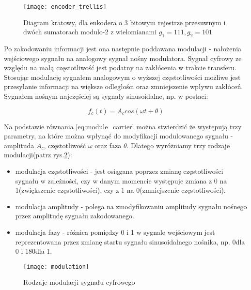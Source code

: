 \documentclass[document.tex]{subfiles}
\begin{document}
\begin{figure}[h]
\texttt{[image: encoder\_trellis]}
\caption{Diagram kratowy, dla enkodera o 3 bitowym rejestrze przesuwnym 
i dwóch sumatorach modulo-2 z wielomianami $g_1 = 111, g_2 = 101$ \protect\cite{Comm_Sklar}}
\label{fig:encoder_trellis}
\end{figure}

\indent Po zakodowaniu informacji jest ona następnie poddawana modulacji - nałożenia wejściowego sygnału na analogowy sygnał nośny modulatora.\cite{Comm_Sklar}\cite{modulacja_put} Sygnał cyfrowy ze względu na małą częstotliwość jest podatny na zakłócenia w trakcie transferu. Stosując modulację 
sygnałem analogowym o wyższej częstotliwości możliwe jest przesyłanie informacji na większe odległości oraz zmniejszenie wpływu zakłóceń.
Sygnałem nośnym najczęściej są sygnały sinusoidalne, np. w postaci\cite{modulacja_agh_amp}\cite{modulacja_put}:

\begin{equation}
    f_c(t) = A_c cos(\omega t + \theta)
    \label{eq:module_carrier}
\end{equation}

Na podstawie równania \ref{eq:module_carrier} można stwierdzić że występują trzy parametry, na które można wpłynąć do modyfikacji modulowanego sygnału - amplituda $A_c$, częstotliwość $\omega$ oraz faza $\theta$. Dlatego wyróżniamy trzy rodzaje modulacji(patrz rys.\ref{fig:modulation}):
\begin{itemize}
    \item modulacja częstotliwości - jest osiągana poprzez zmianę częstotliwości sygnału w zależności, czy w danym momencie występuje zmiana z 0 na 1(zwiększenie częstotliwości), czy z 1 na 0(zmniejszenie częstotliwości).
    \item modulacja amplitudy - polega na zmodyfikowaniu amplitudy sygnału nośnego przez amplitudę sygnału zakodowanego.
    \item modulacja fazy - różnica pomiędzy 0 i 1 w sygnale wejściowym jest reprezentowana przez zmianę startu sygnału sinusoidalnego nośnika, np. 0\degree dla 0 i 180\degree dla 1.
\end{itemize}
\clearpage
\begin{figure}[h]
\texttt{[image: modulation]}
\caption{Rodzaje modulacji sygnału cyfrowego \protect\cite{Comm_Sklar}\cite{modulacja_put}}
\label{fig:modulation}
\end{figure} 
\end{document}
